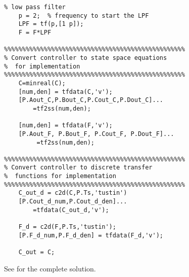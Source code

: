 \begin{lstlisting}
% low pass filter
    p = 2;  % frequency to start the LPF
    LPF = tf(p,[1 p]);
    F = F*LPF
        
%%%%%%%%%%%%%%%%%%%%%%%%%%%%%%%%%%%%%%%%%%%%%%%%%%
% Convert controller to state space equations 
%  for implementation
%%%%%%%%%%%%%%%%%%%%%%%%%%%%%%%%%%%%%%%%%%%%%%%%%%
    C=minreal(C);
    [num,den] = tfdata(C,'v');
    [P.Aout_C,P.Bout_C,P.Cout_C,P.Dout_C]...
    	=tf2ss(num,den);

    [num,den] = tfdata(F,'v');
    [P.Aout_F, P.Bout_F, P.Cout_F, P.Dout_F]...
    	 =tf2ss(num,den);

%%%%%%%%%%%%%%%%%%%%%%%%%%%%%%%%%%%%%%%%%%%%%%%%%%
% Convert controller to discrete transfer 
%  functions for implementation
%%%%%%%%%%%%%%%%%%%%%%%%%%%%%%%%%%%%%%%%%%%%%%%%%%
    C_out_d = c2d(C,P.Ts,'tustin')
    [P.Cout_d_num,P.Cout_d_den]...
    	=tfdata(C_out_d,'v');

    F_d = c2d(F,P.Ts,'tustin');
    [P.F_d_num,P.F_d_den] = tfdata(F_d,'v');

    C_out = C;
\end{lstlisting}

See  for the complete solution.




